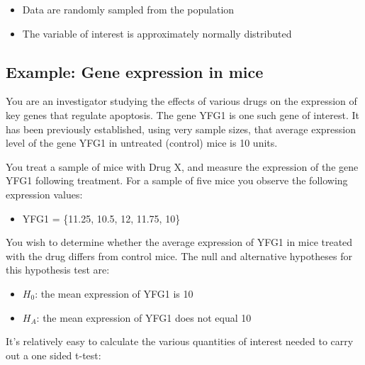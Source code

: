 \documentclass[]{book}
\providecommand{\tightlist}{%
  \setlength{\itemsep}{0pt}\setlength{\parskip}{0pt}}
\theoremstyle{definition}
\theoremstyle{definition}
\theoremstyle{definition}
\theoremstyle{remark}
\begin{document}
\begin{itemize}
\tightlist
\item
  Data are randomly sampled from the population
\item
  The variable of interest is approximately normally distributed
\end{itemize}

\hypertarget{example-gene-expression-in-mice}{%
\subsection{Example: Gene expression in
mice}\label{example-gene-expression-in-mice}}

You are an investigator studying the effects of various drugs on the
expression of key genes that regulate apoptosis. The gene YFG1 is one
such gene of interest. It has been previously established, using very
sample sizes, that average expression level of the gene YFG1 in
untreated (control) mice is 10 units.

You treat a sample of mice with Drug X, and measure the expression of
the gene YFG1 following treatment. For a sample of five mice you observe
the following expression values:

\begin{itemize}
\tightlist
\item
  YFG1 = \{11.25, 10.5, 12, 11.75, 10\}
\end{itemize}

You wish to determine whether the average expression of YFG1 in mice
treated with the drug differs from control mice. The null and
alternative hypotheses for this hypothesis test are:

\begin{itemize}
\tightlist
\item
  \(H_0\): the mean expression of YFG1 is 10
\item
  \(H_A\): the mean expression of YFG1 does not equal 10
\end{itemize}

It's relatively easy to calculate the various quantities of interest
needed to carry out a one sided t-test:
\end{document}
